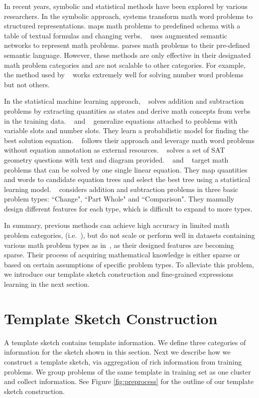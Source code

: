 \documentclass[11pt,letterpaper]{article}
\begin{document}
In recent years, symbolic and statistical methods have been explored by various researchers.
In the symbolic approach, systems transform math word problems to structured representations.  maps math problems to predefined schema with a table of textual formulas and changing verbs. ~ uses augmented semantic networks to represent math problems.  parses math problems to their pre-defined semantic language. However, these methods are only effective in their designated math problem categories and are not scalable to other categories. For example, the method used by ~ works extremely well for solving number word problems but not others.

In the statistical machine learning approach, ~ solves addition and subtraction problems by extracting quantities as states and derive math concepts from verbs in the training data. ~ and ~ generalize equations attached to problems with variable slots and number slots. They learn a probabilistic model for finding the best solution equation. ~ follows their approach and leverage math word problems without equation annotation as external resources. ~ solves a set of SAT geometry questions with text and diagram provided. ~ and ~ target math problems that can be solved by one single linear equation. They map quantities and words to candidate equation trees and select the best tree using a statistical learning model. ~ considers addition and subtraction problems in three basic problem types: ``Change", ``Part Whole" and ``Comparison". They manually design different features for each type, which is difficult to expand to more types.

In summary, previous methods can achieve high accuracy in limited math problem categories, (i.e.~\cite{kushman2014mit, shuming2015dolphin}), but do not scale or perform well in datasets containing various math problem types as in~, as their designed features are becoming sparse. Their process of acquiring mathematical knowledge is either sparse or based on certain assumptions of specific problem types. To alleviate this problem, we introduce our template sketch construction and fine-grained expressions learning in the next section.

\section{Template Sketch Construction}
\label{sec:TemplateProperty}
A template sketch contains template information. We define three categories of information for the sketch shown in this section. Next we describe how we construct a template sketch, via aggregation of rich information from training problems. We group problems of the same template in training set as one cluster and collect information. See Figure \ref{fig:preprocess} for the outline of our template sketch construction.
\end{document}
